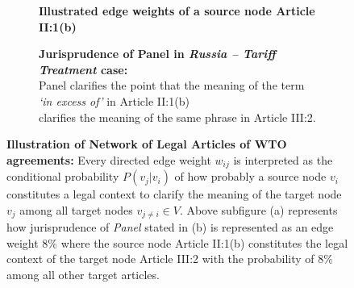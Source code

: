 \begin{figure}[]
    \captionsetup[subfigure]{justification=centering}
    \begin{subfigure}[b]{1\textwidth}
        \centering{
            
        }
        \caption{\textbf{Illustrated edge weights of a source node Article II:1(b)}}
        \label{subfig:a:art2b}
    \end{subfigure}
    \vfill
    \begin{subfigure}[b]{1\textwidth}
        \centering{
            
        }
        \centering
        \caption{\textbf{Jurisprudence of Panel in \textit{Russia – Tariff Treatment} case:} \\ Panel clarifies the point that the meaning of the term \textit{`in excess of'} in Article II:1(b) \\ clarifies the meaning of the same phrase in Article III:2.}
        \label{subfig:a:condprob}
    \end{subfigure}
    \caption{\textbf{Illustration of Network of Legal Articles of WTO agreements: }Every directed edge weight $w_{ij}$ is interpreted as the conditional probability $P(v_j|v_i)$ of how probably a source node $v_i$ constitutes a legal context to clarify the meaning of the target node $v_j$ among all target nodes $v_{j \neq i} \in V$. Above subfigure (a) represents how jurisprudence of \textit{Panel} stated in (b) is represented as an edge weight $8\%$ where the source node Article II:1(b) constitutes the legal context of the target node Article III:2 with the probability of $8\%$ among all other target articles.}
    \label{fig:def-example}
\end{figure}




